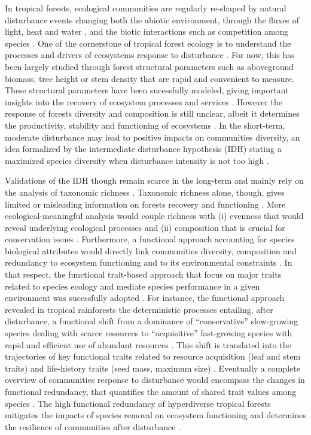 \documentclass[fleqn,10pt]{ArtEcoFoG} %
\begin{document}
In tropical forests, ecological communities are regularly re-shaped by
natural disturbance events changing both the abiotic environment,
through the fluxes of light, heat and water \citep{Goulamoussene2017},
and the biotic interactions such as competition among species
\citep{Chesson2000, Herault2018}. One of the cornerstone of tropical
forest ecology is to understand the processes and drivers of ecosystems
response to disturbance \citep{Chazdon2003a}. For now, this has been
largely studied through forest structural parameters such as aboveground
biomass, tree height or stem density
\citep{Piponiot2016, Rutishauser2016} that are rapid and convenient to
measure. These structural parameters have been sucessfully modeled,
giving important insights into the recovery of ecosystem processes and
services \citep{Herault2018}. However the response of forests diversity
and composition is still unclear, albeit it determines the productivity,
stability and functioning of ecosystems \citep{Tilman2014, Liang2016}.
In the short-term, moderate disturbance may lead to positive impacts on
communities diversity, an idea formalized by the intermediate
disturbance hypothesis (IDH) stating a maximized species diversity when
disturbance intensity is not too high \citep{Molino2001, Kariuki2006a}.

Validations of the IDH though remain scarce in the long-term and mainly
rely on the analysis of taxonomic richness \citep{Molino2001}. Taxonomic
richness alone, though, gives limited or misleading information on
forests recovery and functioning \citep{Chaudhary2016}. More
ecological-meaningful analysis would couple richness with (i) evenness
that would reveal underlying ecological processes and (ii) composition
that is crucial for conservation issues
\citep{Lavorel2002, Bellwood2006}. Furthermore, a functional approach
accounting for species biological attributes would directly link
communities diversity, composition and redundancy to ecosystem
functioning and to its environmental constraints
\citep{Violle2007b, Baraloto2012a}. In that respect, the functional
trait-based approach that focus on major traits related to species
ecology and mediate species performance in a given environment was
sucessfully adopted \citep{Diaz2005}. For instance, the functional
approach revealed in tropical rainforests the deterministic processes
entailing, after disturbance, a functional shift from a dominance of
``conservative'' slow-growing species dealing with scarce resources to
``acquisitive'' fast-growing species with rapid and efficient use of
abundant resources \citep{Reich2014, Herault2011}. This shift is
translated into the trajectories of key functional traits related to
resource acquisition (leaf and stem traits) and life-history traits
(seed mass, maximum size)
\citep{Wright2004, TerSteege2006, Westoby2006a, Chave2009b}. Eventually
a complete overview of communities response to disturbance would
encompass the changes in functional redundancy, that quantifies the
amount of shared trait values among species \citep{Carmona2016}. The
high functional redundancy of hyperdiverse tropical forests
\citep{Bellwood2006} mitigates the impacts of species removal on
ecosystem functioning and determines the resilience of communities after
disturbance \citep{Elmqvist2003, Diaz2005}.
\end{document}
